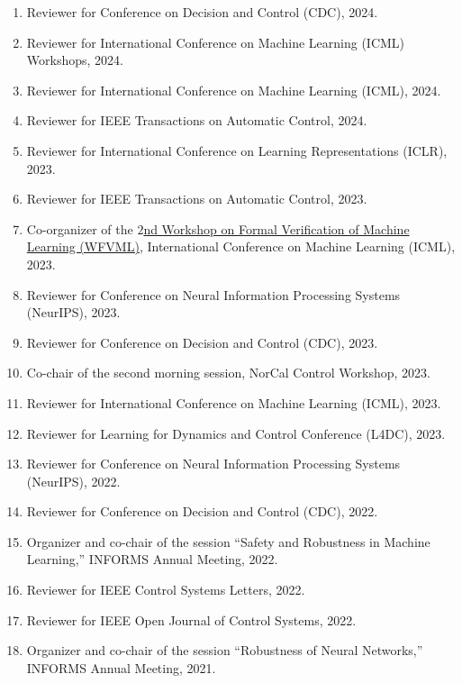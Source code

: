 \documentclass[11pt]{article}
\begin{document}
	\begin{enumerate}[label={\arabic*.}]
		\item Reviewer for Conference on Decision and Control (CDC), 2024.
		\item Reviewer for International Conference on Machine Learning (ICML) Workshops, 2024.
		\item Reviewer for International Conference on Machine Learning (ICML), 2024.
		\item Reviewer for IEEE Transactions on Automatic Control, 2024.
		\item Reviewer for International Conference on Learning Representations (ICLR), 2023.
		\item Reviewer for IEEE Transactions on Automatic Control, 2023.
		\item Co-organizer of the \href{https://www.ml-verification.com/2023}{$2$nd Workshop on Formal Verification of Machine Learning (WFVML)}, International Conference on Machine Learning (ICML), 2023.
		\item Reviewer for Conference on Neural Information Processing Systems (NeurIPS), 2023.
		\item Reviewer for Conference on Decision and Control (CDC), 2023.
		\item Co-chair of the second morning session, NorCal Control Workshop, 2023.
		\item Reviewer for International Conference on Machine Learning (ICML), 2023.
		\item Reviewer for Learning for Dynamics and Control Conference (L4DC), 2023.
		\item Reviewer for Conference on Neural Information Processing Systems (NeurIPS), 2022.
		\item Reviewer for Conference on Decision and Control (CDC), 2022.
		\item Organizer and co-chair of the session ``Safety and Robustness in Machine Learning,'' INFORMS Annual Meeting, 2022.
		\item Reviewer for IEEE Control Systems Letters, 2022.
		\item Reviewer for IEEE Open Journal of Control Systems, 2022.
		\item Organizer and co-chair of the session ``Robustness of Neural Networks,'' INFORMS Annual Meeting, 2021.

\end{enumerate}
\end{document}
